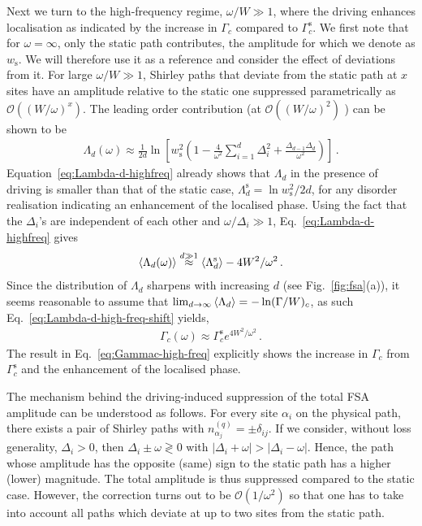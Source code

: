 \documentclass[aps,prl,twocolumn,superscriptaddress,nobalancelastpage,longbibliography]{revtex4-2}
\newcommand\eq[1]{\begin{align}#1\end{align}}
\begin{document}
Next we turn to the high-frequency regime, $\omega/W\gg 1$, where the driving enhances localisation as indicated by the increase in $\Gamma_c$ compared to $\Gamma_c^\mathrm{s}$.
We first note that for $\omega=\infty$, only the static path contributes, the amplitude for which we denote as $w_\mathrm{s}$. We will therefore use it as a reference and consider the effect of deviations from it.
For large $\omega/W\gg 1$, Shirley paths that deviate from the static path at $x$ sites have an amplitude relative to the static one suppressed parametrically as $\mathcal{O}((W/\omega)^x)$. 
The leading order contribution (at $\mathcal{O}((W/\omega)^{2})$ ) can be shown to be~\cite{supp}
\eq{
\Lambda_d(\omega) \approx \frac{1}{2d}\ln\left[w_\mathrm{s}^2\left(1-\frac{4}{\omega^2}\sum_{i=1}^d\Delta_i^2+\frac{\Delta_{d-1}\Delta_{d}}{\omega^2}\right)\right]\,.
\label{eq:Lambda-d-highfreq}
}
Equation~\ref{eq:Lambda-d-highfreq} already shows that $\Lambda_d$ in the presence of driving is smaller than that of the static case, $\Lambda_d^\mathrm{s}=\ln w_\mathrm{s}^2/2d$, for any disorder realisation indicating an enhancement of the localised phase.
Using the fact that the $\Delta_i$'s are independent of each other and $\omega/\Delta_i\gg1$, Eq.~\ref{eq:Lambda-d-highfreq} gives
\eq{
\braket{\Lambda_d(\omega)}\overset{d\gg1}{\approx}\braket{\Lambda_d^\mathrm{s}}-4W^2/\omega^2\,.
\label{eq:Lambda-d-high-freq-shift}
}
Since the distribution of $\Lambda_d$ sharpens with increasing $d$ (see Fig.~\ref{fig:fsa}(a)), it seems reasonable to assume that $\lim_{d\to\infty}\braket{\Lambda_d}=-\ln(\Gamma/W)_c$, as such Eq.~\ref{eq:Lambda-d-high-freq-shift} yields,
\eq{
\Gamma_c(\omega) \approx \Gamma_c^\mathrm{s}e^{4W^2/\omega^2}\,.
\label{eq:Gammac-high-freq}
}
The result in Eq.~\ref{eq:Gammac-high-freq} explicitly shows the increase in $\Gamma_c$ from $\Gamma_c^\mathrm{s}$ and the enhancement of the localised phase.

The mechanism behind the driving-induced suppression of the total FSA amplitude can be understood as follows. 
For every site $\alpha_i$ on the physical path, there exists a pair of Shirley paths with $n_{\alpha_j}^{(q)}=\pm \delta_{ij}$. 
If we consider, without loss generality, $\Delta_i>0$, then $\Delta_i\pm \omega \gtrless 0$ with $\vert\Delta_i+ \omega\vert>\vert\Delta_i-\omega\vert$.
Hence, the path whose amplitude has the opposite (same) sign to the static path has a higher (lower) magnitude.
The total amplitude is thus suppressed compared to the static case. However, the correction turns out to be $\mathcal{O}(1/\omega^2)$ so that one has to take into account all paths which deviate at up to two sites from the static path.
\end{document}
